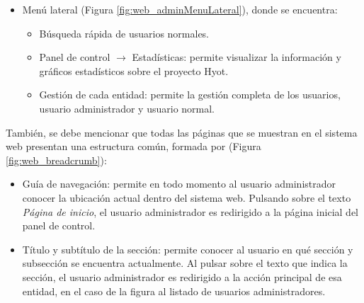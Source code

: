 \documentclass[12pt,a4paper, twoside]{report}
\begin{document}
\begin{itemize}
		\item Menú lateral (Figura \ref{fig:web_adminMenuLateral}), donde se encuentra: 
			\begin{itemize}
				\item Búsqueda rápida de usuarios normales.
				\item Panel de control $\rightarrow$ Estadísticas: permite visualizar la información y gráficos estadísticos sobre el proyecto Hyot.
				\item Gestión de cada entidad: permite la gestión completa de los usuarios, usuario administrador y usuario normal.
				
			\end{itemize}
	\end{itemize}
	
	
	También, se debe mencionar que todas las páginas que se muestran en el sistema web presentan una estructura común, formada por (Figura \ref{fig:web_breadcrumb}): 
	
	\begin{itemize}
		\item Guía de navegación: permite en todo momento al usuario administrador conocer la ubicación actual dentro del sistema web. Pulsando sobre el texto \textit{Página de inicio}, el usuario administrador es redirigido a la página inicial del panel de control.
		\item Título y subtítulo de la sección: permite conocer al usuario en qué sección y subsección se encuentra actualmente. Al pulsar sobre el texto que indica la sección, el usuario administrador es redirigido a la acción principal de esa entidad, en el caso de la figura al listado de usuarios administradores.
	\end{itemize}
	
		
\end{document}
